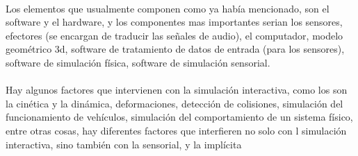 \documentclass{bmcart}
\begin{document}
\paragraph{}
Los elementos que usualmente componen como ya había mencionado, son el software y el hardware, y los componentes mas importantes serian los sensores, efectores (se encargan de traducir las señales de audio), el computador, modelo geométrico 3d, software de tratamiento de datos de entrada (para los sensores), software de simulación física, software de simulación sensorial. 
\paragraph{}
Hay algunos factores que intervienen con la simulación interactiva, como los son la  cinética y la dinámica, deformaciones, detección de colisiones, simulación del funcionamiento de vehículos, simulación del comportamiento de un sistema físico, entre otras cosas, hay diferentes factores que interfieren no solo con l simulación interactiva, sino también con la sensorial, y la implícita 
\end{document}
